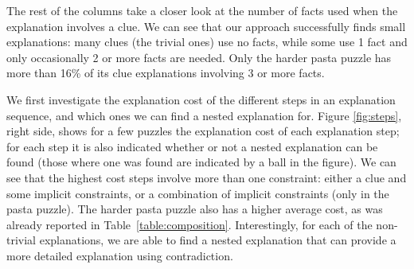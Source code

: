 The rest of the columns take a closer look at the number of facts used when the explanation involves a clue. We can see that our approach successfully finds small explanations: many clues (the trivial ones) use no facts, while some use 1 fact and only occasionally 2 or more facts are needed. Only the harder pasta puzzle has more than 16\% of its clue explanations involving 3 or more facts.

We first investigate the explanation cost of the different steps in an explanation sequence, and which ones we can find a nested explanation for. Figure \ref{fig:steps}, right side, shows for a few puzzles the explanation cost of each explanation step; for each step it is also indicated whether or not a nested explanation can be found (those where one was found are indicated by a ball in the figure). We can see that the highest cost steps involve more than one constraint: either a clue and some implicit constraints, or a combination of implicit constraints (only in the pasta puzzle). The harder pasta puzzle also has a higher average cost, as was already reported in Table~\ref{table:composition}. Interestingly, for each of the non-trivial explanations, we are able to find a nested explanation that can provide a more detailed explanation using contradiction. 


